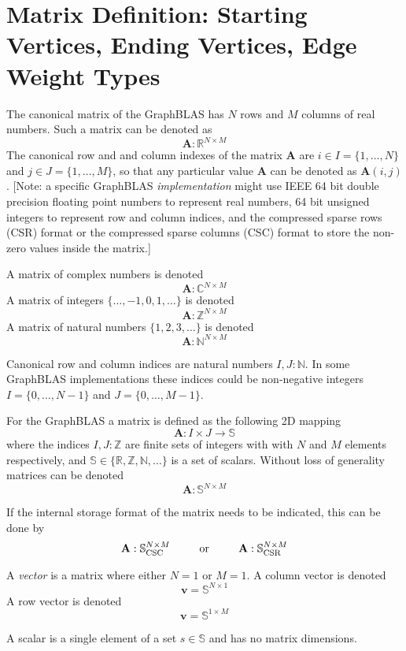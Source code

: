 \section{Matrix Definition: Starting Vertices, Ending Vertices, Edge Weight Types}
  The canonical matrix of the GraphBLAS has $N$ rows and $M$ columns of real numbers.  Such a matrix can be denoted as
$$
  \mathbf{A}: \mathbb{R}^{N \times M}
$$
The canonical row and and column indexes of the matrix $\mathbf{A}$ are $i \in I = \{1,\ldots,N\}$ and $j \in J = \{1,\ldots,M\}$, so that any particular value $\mathbf{A}$ can be denoted as $\mathbf{A}(i,j)$.  [Note: a specific GraphBLAS \emph{implementation} might use IEEE 64 bit double precision floating point numbers to represent real numbers, 64 bit unsigned integers to represent row and column indices, and the compressed sparse rows (CSR) format or the compressed sparse columns (CSC) format to store the non-zero values inside the matrix.]

  A matrix of complex numbers is denoted
$$
  \mathbf{A}: \mathbb{C}^{N \times M}
$$
  A matrix of integers $\{\ldots, -1, 0, 1, \ldots\}$ is denoted
$$
  \mathbf{A}: \mathbb{Z}^{N \times M}
$$
  A matrix of natural numbers $\{1, 2, 3, \ldots\}$ is denoted
$$
  \mathbf{A}: \mathbb{N}^{N \times M}
$$

  Canonical row and column indices are natural numbers $I,J : \mathbb{N}$.  In some GraphBLAS implementations these indices could be non-negative integers  $I = \{0,\ldots,N-1\}$ and $J = \{0,\ldots,M-1\}$.
  
  For the GraphBLAS a matrix is defined as the following 2D mapping
$$
  \mathbf{A} : I \times J \rightarrow \mathbb{S}
$$
where the indices $I, J : \mathbb{Z}$ are finite sets of integers with with $N$ and $M$ elements respectively, and  $\mathbb{S} \in \{\mathbb{R},\mathbb{Z},\mathbb{N}, \ldots \}$ is a set of scalars.  Without loss of generality matrices can be denoted
$$
  \mathbf{A}: \mathbb{S}^{N \times M}
$$

If the internal storage format of the matrix needs to be indicated, this can be done by
$$
  \mathbf{A}: \mathbb{S}^{N \times M}_{\rm CSC}  ~~~~~~~~ {\rm or}  ~~~~~~~~ 
  \mathbf{A}: \mathbb{S}^{N \times M}_{\rm CSR}
$$

  A \emph{vector} is a matrix where either $N=1$ or $M=1$. A column vector is denoted
$$
 \mathbf{v} = \mathbb{S}^{N \times 1}
$$
  A row vector is denoted
$$
  \mathbf{v} = \mathbb{S}^{1 \times M}
$$

  A scalar is a single element of a set $s \in \mathbb{S}$ and has no matrix dimensions.

